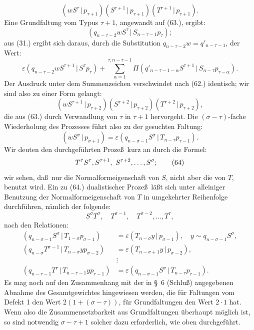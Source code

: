 \documentclass[11pt]{article}
\providecommand{\pair}[2]{(#1\,|\,#2)}
\providecommand{\eps}{\varepsilon}
\begin{document}
\begin{equation}
 \pair{wS^\tau}{p_{\tau+1}}\pair{S^{\tau+1}}{p_{\tau+1}}\pair{T^{\tau+1}}{p_{\tau+1}}.
\tag{63}
\end{equation}
Eine Grundfaltung vom Typus $\tau+1$, angewandt auf (63.), ergibt:
\[
 \pair{q_{n-\tau-2}wS^\tau}{S_{n-\tau-1}p_\tau};
\]
aus (31.) ergibt sich daraus, durch die Substitution $q_{n-\tau-2}w=q'_{n-\tau-1}$, der Wert:
\[
 \eps\pair{q_{n-\tau-2}wS^{\tau+1}}{S^\tau p_\tau}
 +\sum_{\alpha=1}^{\tau,n-\tau-1}\Pi\pair{q'_{n-\tau-1-\alpha}S^{\tau+1}}{S_{n-\tau}p_{\tau-\alpha}}.
\]
Der Ausdruck unter dem Summenzeichen verschwindet nach (62.) identisch; wir sind also zu einer Form gelangt:
\[
 \pair{wS^{\tau+1}}{p_{\tau+2}}\pair{S^{\tau+2}}{p_{\tau+2}}\pair{T^{\tau+2}}{p_{\tau+2}},
\]
die aus (63.) durch Verwandlung von $\tau$ in $\tau+1$ hervorgeht. Die $(\sigma-\tau)$-fache Wiederholung des Prozesses f\"uhrt also zu der gesuchten Faltung:
\[
 \pair{wS^\sigma}{p_{\sigma+1}}=\eps\pair{q_{n-\sigma-1}S^\sigma}{T_{n-\tau}p_{\tau-1}}.
\]
Wir deuten den durchgef\"uhrten Proze\ss\ kurz an durch die Formel:
\begin{equation}
 T^\tau S^\tau,\\ S^{\tau+1},\ S^{\tau+2},\ldots,S^\sigma;
\tag{64}
\end{equation}
wir sehen, da\ss\ nur die Normalformeigenschaft von $S$, nicht aber die von $T$, benutzt wird. Ein zu (64.) dualistischer Proze\ss\ l\"a\ss t sich unter alleiniger Benutzung der Normalformeigenschaft von $T$ in umgekehrter Reihenfolge durchf\"uhren, n\"amlich der folgende:
\begin{equation}
 S^\sigma T^\sigma,
\quad T^{\sigma-1},\quad T^{\sigma-2},\ldots,T^\tau,
\tag{65}
\end{equation}
nach den Relationen:
\begin{align*}
\pair{q_{n-\sigma-1}S^\sigma}{T_{1-\sigma}p_{\sigma-1}}&=\eps\pair{T_{n-\sigma}y}{p_{\sigma-1}},\quad y\sim q_{n-\sigma-1}S^\sigma,\\
\pair{q_{n-\sigma}T^{\sigma-1}}{T_{n-\sigma}yp_{\sigma-2}}&=\eps\pair{T_{n-\sigma+1}y}{p_{\sigma-2}},\\
&\vdots\\
\pair{q_{n-\tau-1}T^\tau}{T_{n-\tau-1}yp_{\tau-1}}&=\eps\pair{q_{n-\sigma-1}S^\sigma}{T_{n-\tau}p_{\tau-1}}.
\end{align*}
Es mag noch auf den Zusammenhang mit der in \S\ 6 (Schlu\ss) angegebenen Abnahme des Gesamtgewichtes hingewiesen werden, die f\"ur Faltungen vom Defekt 1 den Wert $2(1+(\sigma-\tau))$, f\"ur Grundfaltungen den Wert $2\cdot1$ hat. Wenn also die Zusammensetzbarkeit aus Grundfaltungen \"uberhaupt m\"oglich ist, so sind notwendig $\sigma-\tau+1$ solcher dazu erforderlich, wie oben durchgef\"uhrt.
\end{document}
